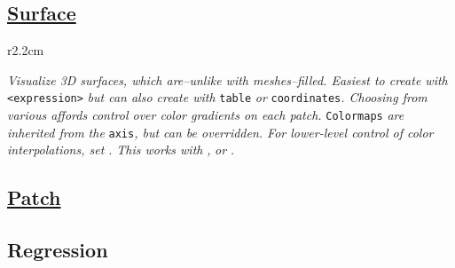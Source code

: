 \subsection*{\href{\docurl\#pgfp./pgfplots/surf}{Surface}}

\begin{wrapfigure}[5]{r}{2.2cm}
\vspace{-8mm}
\resizebox{2cm}{!}{}
\end{wrapfigure}

\textit{Visualize 3D surfaces, which are--unlike with meshes--filled. Easiest to create with }\texttt{<expression>}\textit{ but can also create with }\texttt{table}\textit{ or }\texttt{coordinates}\textit{. Choosing from various  affords control over color gradients on each patch. }\texttt{Colormaps}\textit{ are inherited from the }\texttt{axis}\textit{, but can be overridden. For lower-level control of color interpolations, set }\href{\docurl\#pgfp./pgfplots/mesh/color:input}{}\textit{. This works with }\href{\docurl\#pgfp./pgfplots/z:buffer}{}\textit{, }\href{\docurl\#pgfp./pgfplots/patch}{}\textit{ or }\href{\docurl\#pgfp./pgfplots/surf}{}\textit{.}





\subsection*{\href{\docurl\#pgfp./pgfplots/patch}{Patch}}

\begin{comment}

\begin{wrapfigure}[5]{r}{2.2cm}
\vspace{-8mm}
\resizebox{2cm}{!}{}
\end{wrapfigure}

\blindtext
\end{comment}


\subsection*{Regression}

